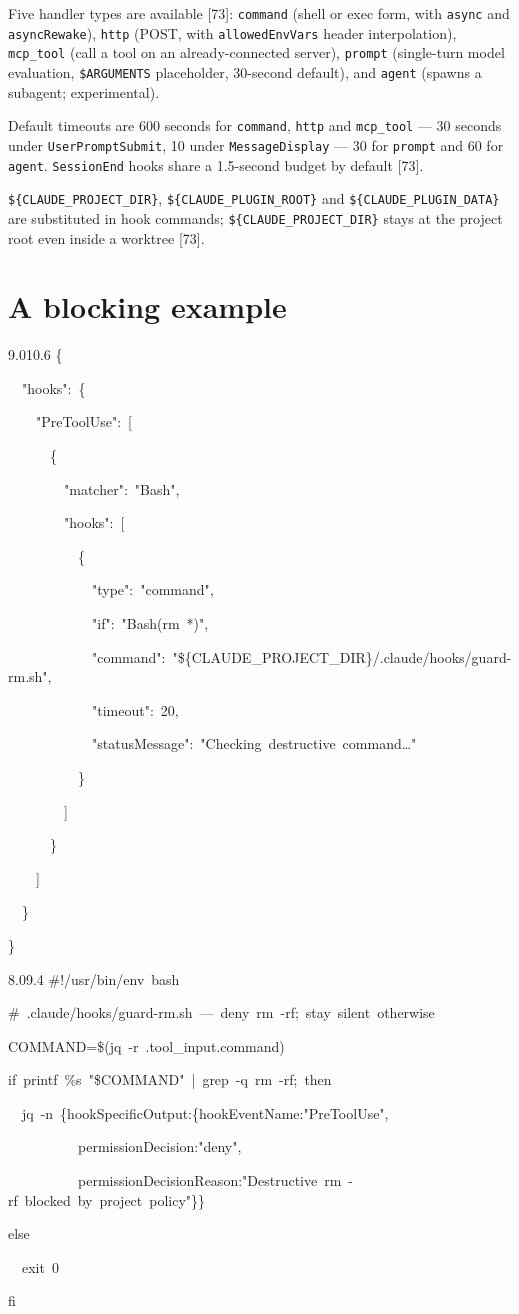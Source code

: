 \documentclass[11pt,a4paper,twoside,openany]{book}
\newcommand{\cl}[1]{\noindent\mbox{#1}\par}
\begin{document}
Five handler types are available [73]: \texttt{command} (shell or exec form, with \texttt{async} and \texttt{async\allowbreak{}Rewake}), \texttt{http} (POST, with \texttt{allowed\allowbreak{}Env\allowbreak{}Vars} header interpolation), \texttt{mcp\_\allowbreak{}tool} (call a tool on an already-connected server), \texttt{prompt} (single-turn model evaluation, \texttt{\$ARGUMENTS} placeholder, 30-second default), and \texttt{agent} (spawns a subagent; experimental).


Default timeouts are 600 seconds for \texttt{command}, \texttt{http} and \texttt{mcp\_\allowbreak{}tool} — 30 seconds under \texttt{User\allowbreak{}Prompt\allowbreak{}Submit}, 10 under \texttt{Message\allowbreak{}Display} — 30 for \texttt{prompt} and 60 for \texttt{agent}. \texttt{Session\allowbreak{}End} hooks share a 1.5-second budget by default [73].


\texttt{\$\{CLAUDE\_\allowbreak{}PROJECT\_\allowbreak{}DIR\}}, \texttt{\$\{CLAUDE\_\allowbreak{}PLUGIN\_\allowbreak{}ROOT\}} and \texttt{\$\{CLAUDE\_\allowbreak{}PLUGIN\_\allowbreak{}DATA\}} are substituted in hook commands; \texttt{\$\{CLAUDE\_\allowbreak{}PROJECT\_\allowbreak{}DIR\}} stays at the project root even inside a worktree [73].


\FloatBarrier
\setcounter{section}{2}
\section{A blocking example}

\begin{codeblock}{9.0}{10.6}
\cl{\{}
\cl{~~"hooks":~\{}
\cl{~~~~"PreToolUse":~[}
\cl{~~~~~~\{}
\cl{~~~~~~~~"matcher":~"Bash",}
\cl{~~~~~~~~"hooks":~[}
\cl{~~~~~~~~~~\{}
\cl{~~~~~~~~~~~~"type":~"command",}
\cl{~~~~~~~~~~~~"if":~"Bash(rm~*)",}
\cl{~~~~~~~~~~~~"command":~"\$\{CLAUDE\_PROJECT\_DIR\}/.claude/hooks/guard-rm.sh",}
\cl{~~~~~~~~~~~~"timeout":~20,}
\cl{~~~~~~~~~~~~"statusMessage":~"Checking~destructive~command…"}
\cl{~~~~~~~~~~\}}
\cl{~~~~~~~~]}
\cl{~~~~~~\}}
\cl{~~~~]}
\cl{~~\}}
\cl{\}}
\end{codeblock}

\begin{codeblock}{8.0}{9.4}
\cl{\#!/usr/bin/env~bash}
\cl{\#~.claude/hooks/guard-rm.sh~—~deny~rm~-rf;~stay~silent~otherwise}
\cl{COMMAND=\$(jq~-r~\textquotesingle{}.tool\_input.command\textquotesingle{})}
\cl{if~printf~\textquotesingle{}\%s\textquotesingle{}~"\$COMMAND"~|~grep~-q~\textquotesingle{}rm~-rf\textquotesingle{};~then}
\cl{~~jq~-n~\textquotesingle{}\{hookSpecificOutput:\{hookEventName:"PreToolUse",}
\cl{~~~~~~~~~~permissionDecision:"deny",}
\cl{~~~~~~~~~~permissionDecisionReason:"Destructive~rm~-rf~blocked~by~project~policy"\}\}\textquotesingle{}}
\cl{else}
\cl{~~exit~0}
\cl{fi}
\end{codeblock}
\end{document}
